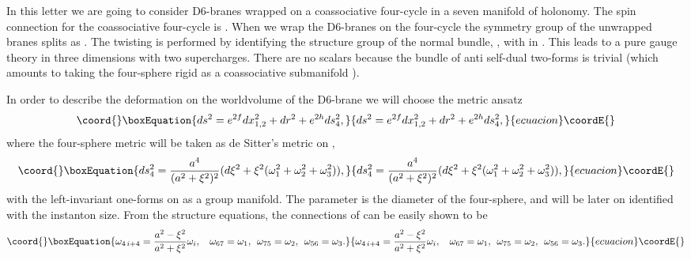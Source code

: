 \documentclass[12pt,a4paper]{article}
\begin{document}
In this letter we are going to consider D6-branes wrapped on a coassociative four-cycle \coordHE{} 
in a seven manifold of \coordHE{} holonomy. The spin connection for the coassociative four-cycle is 
\coordHE{}. When we wrap the D6-branes on the four-cycle the \coordHE{} 
symmetry group of the unwrapped branes splits as \coordHE{}. The 
twisting is performed by identifying the structure group of the normal bundle, \coordHE{}, 
with \coordHE{} in \coordHE{}. This leads to a pure gauge theory in three 
dimensions with two supercharges. There are no scalars \cite{Gomis} because the bundle of 
anti self-dual two-forms is trivial (which amounts to taking the four-sphere rigid as a coassociative 
submanifold \cite{McLean}).
  
In order to describe the deformation on the worldvolume of the D6-brane we will choose the 
metric ansatz 
\begin{equation}\coord{}\boxEquation{
ds^2 = e^{2f} dx_{1,2}^2 + dr^2 + e^{2h} ds_4^2,
\label{7}
}{
ds^2 = e^{2f} dx_{1,2}^2 + dr^2 + e^{2h} ds_4^2,
}{ecuacion}\coordE{}\end{equation}
where the four-sphere metric will be taken as de Sitter's metric on \coordHE{},
\begin{equation}\coord{}\boxEquation{
ds_4^2 = \frac {a^4}{(a^2 + \xi^2)^2} ( d \xi^2 + \xi^2 (\omega_1^2 + \omega_2^2 + \omega_3^2)),
\label{8}
}{
ds_4^2 = \frac {a^4}{(a^2 + \xi^2)^2} ( d \xi^2 + \xi^2 (\omega_1^2 + \omega_2^2 + \omega_3^2)),
}{ecuacion}\coordE{}\end{equation}
with \coordHE{} the left-invariant one-forms on \coordHE{} as a group manifold. The parameter \coordHE{} is 
the diameter of the four-sphere, and will be later on identified with the instanton size. From 
the structure equations, the \coordHE{} connections \coordHE{} of \coordHE{} can be easily shown to be
\begin{equation}\coord{}\boxEquation{
\omega_{4 \, i+4} = \frac {a^2 -\xi^2}{a^2 + \xi^2} \omega_i, \: \: \: \: \omega_{67} = \omega_1, 
\: \: \omega_{75} = \omega_2, \: \: \omega_{56} = \omega_3.
\label{9}
}{
\omega_{4 \, i+4} = \frac {a^2 -\xi^2}{a^2 + \xi^2} \omega_i, \: \: \: \: \omega_{67} = \omega_1, 
\: \: \omega_{75} = \omega_2, \: \: \omega_{56} = \omega_3.
}{ecuacion}\coordE{}\end{equation}
  
\end{document}
